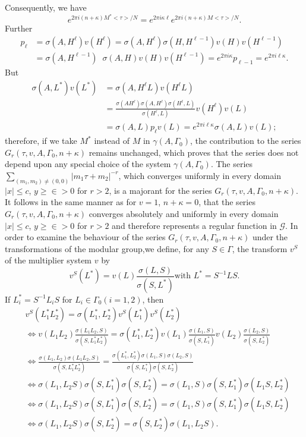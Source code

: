 Consequently, we have 
$$
e^{2\pi i (n+\kappa)M^{\ast} <\tau>/N} =e^{2\pi i \kappa \ell} e^{2\pi
i(n+\kappa)M<\tau>/N}.
$$
Further
\begin{align*}
p_{\ell} & = \sigma(A, H^{\ell})v(H^{\ell}) = \sigma(A,H^{\ell})
\sigma(H,H^{\ell-1}) v(H)v(H^{\ell-1})\\
& = \sigma(A,H^{\ell-1}) \;\; \sigma(A,H) v(H) v(H^{\ell-1}) = e^{2\pi i
  \kappa} p_{\ell-1} = e^{2\pi i \ell \kappa}.
\end{align*}
But
\begin{align*}
\sigma(A,L^{\ast}) v(L^{\ast}) & = \sigma(A,H^{\ell}L)v(H^{\ell}L)\\
& = \frac{\sigma(AH^{\ell})
  \sigma(A,H^{\ell})\sigma(H^{\ell},L)}{\sigma(H^{\ell}, L)}
v(H^{\ell}) v(L)\\
& = \sigma (A,L) p_{\ell}v(L) =e^{2\pi i \ell \kappa} \sigma(A,L) v(L);
\end{align*}
therefore, if we take $M^{\ast}$ instead of $M$ in
$\gamma(A,\Gamma_0)$, the contribution to the series $G_r(\tau, v, A,
\Gamma_0, n+\kappa)$ remains unchanged, which proves that the series
does not depend upon any special choice of the system
$\gamma(A,\Gamma_0)$. The series
$\sum\limits_{(m_1,m_2)\neq(0,0)}|m_1\tau+m_2|^{-r}$, which converges
uniformly in every domain \pageoriginale $|x|\leq c$, $y\geq
\in >0$ for $r>2$, is a majorant for the series $G_r(\tau, v,
A, \Gamma_0, n+\kappa)$. It follows in the same manner as for $v=1$,
$n+\kappa=0$, that the series $G_r(\tau, v, A, \Gamma_0, n + \kappa)$
converges absolutely and uniformly in every domain $|x|\leq c$,
$y\geq \in >0$ for $r>2$ and therefore represents a regular
function in $\mathscr{G}$. In order to examine the behaviour of the
series $G_r(\tau, v,A,\Gamma_0 , n+\kappa)$ under the transformations
of the modular group,we define, for any $S\in \Gamma$, the 
transform $v^S$ of the multiplier system $v$ by 
$$
v^S(L^{\ast}) = v(L) \frac{\sigma(L,S)}{\sigma(S,L^{\ast})} \text{
  with } L^{\ast}=S^{-1}LS.
$$
If $L^{\ast}_i =S^{-1}L_i S$ for $L_i \in \Gamma_0 (i=1,2)$,
then 
\begin{align*}
&v^S(L^{\ast}_1 L^{\ast}_2)  = \sigma(L^{\ast}_1, L^{\ast}_2)
v^S(L^{\ast}_1)v^S(L^{\ast}_2) \\
&\Longleftrightarrow v(L_1L_2) \frac{\sigma(L_1L_2,
  S)}{\sigma(S,L^{\ast}_1 L^{\ast}_2)}  = \sigma(L^{\ast}_1,
L^{\ast}_2) v(L_1) \frac{\sigma(L_1,S)}{\sigma(S,L^{\ast}_1)} v(L_2)
\frac{\sigma(L_2,S)}{\sigma(S,L^{\ast}_2)} \\
&\Longleftrightarrow
\frac{\sigma(L_1,L_2)\sigma(L_1L_2,S)}{\sigma(S,L^{\ast}_1
  L^{\ast}_2)} = \frac{\sigma(L^{\ast}_1, L^{\ast}_2) \sigma(L_1,S)
\sigma(L_2,S)}{\sigma(S,L^{\ast}_1)\sigma(S,L^{\ast}_2)}\\
&\Longleftrightarrow \sigma(L_1, L_2 S) \sigma(S,L^{\ast}_1)
\sigma(S,L^{\ast}_2) = \sigma(L_1,S) \sigma(S,L^{\ast}_1)
\sigma(L_1S,L^{\ast}_2)\\
&\Longleftrightarrow \sigma(L_1, L_2 S)\sigma(S, L^{\ast}_1)
\sigma(S,L^{\ast}_2) = \sigma(L_1, S) \sigma(S,L^{\ast}_1)
\sigma(L_1 S, L^{\ast}_2)\\
&\Longleftrightarrow \sigma(L_1, L_2 S) \sigma(S, L^{\ast}_2) 
=\sigma(S,L^{\ast}_2) \sigma(L_1,L_2S).
\end{align*}
